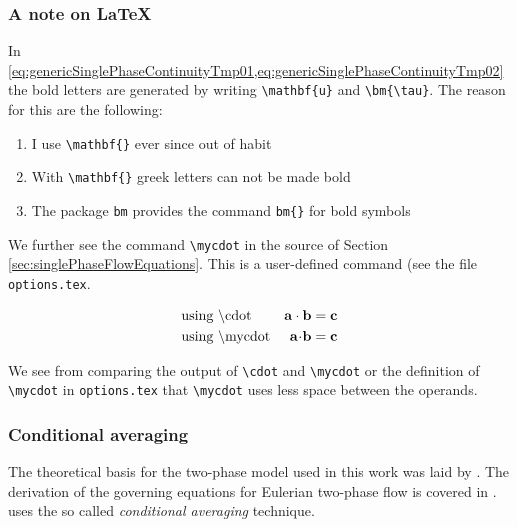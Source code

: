 %
%
%
%
%



\subsubsection*{A note on \LaTeX{}}

In \cref{eq:genericSinglePhaseContinuityTmp01,eq:genericSinglePhaseContinuityTmp02} the bold letters 
are generated by writing \verb+\mathbf{u}+ and \verb+\bm{\tau}+. The reason for this are the 
following:

\begin{enumerate}
	\item I use \verb+\mathbf{}+ ever since out of habit
	\item With \verb+\mathbf{}+ greek letters can not be made bold
	\item The package \verb+bm+ provides the command \verb+bm{}+ for bold symbols
\end{enumerate}


We further see the command \verb+\mycdot+ in the source of Section \ref{sec:singlePhaseFlowEquations}. 
This is a user-defined command (see the file \verb+options.tex+.

\begin{align}
	&\text{using \textbackslash{}cdot} 		& \mathbf{a} \cdot \mathbf{b} &= \mathbf{c} \\
	&\text{using \textbackslash{}mycdot} 	& \mathbf{a} \kern-.2em\cdot\kern-.2em \mathbf{b} &= \mathbf{c} \\
\end{align}

We see from comparing the output of \verb+\cdot+ and \verb+\mycdot+ or the definition of 
\verb+\mycdot+ in \verb+options.tex+ that \verb+\mycdot+ uses less space between the operands.




\subsubsection{Conditional averaging}

The theoretical basis for the two-phase model used in this work was laid by \citet{weller1993}. 
The derivation of the governing equations for Eulerian two-phase flow is covered in 
\cite{hill1998,rusche2002,openCFD2005}. \citet{weller1993} uses the so called 
\emph{conditional averaging} technique.

